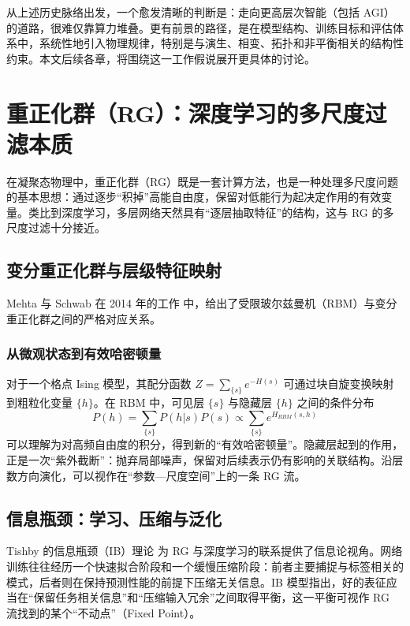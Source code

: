 \documentclass[12pt,a4paper]{article}
\begin{document}
从上述历史脉络出发，一个愈发清晰的判断是：走向更高层次智能（包括 AGI）的道路，很难仅靠算力堆叠。更有前景的路径，是在模型结构、训练目标和评估体系中，系统性地引入物理规律，特别是与演生、相变、拓扑和非平衡相关的结构性约束。本文后续各章，将围绕这一工作假说展开更具体的讨论。

\section{重正化群（RG）：深度学习的多尺度过滤本质}

在凝聚态物理中，重正化群（RG）既是一套计算方法，也是一种处理多尺度问题的基本思想：通过逐步“积掉”高能自由度，保留对低能行为起决定作用的有效变量。类比到深度学习，多层网络天然具有“逐层抽取特征”的结构，这与 RG 的多尺度过滤十分接近。

\subsection{变分重正化群与层级特征映射}

Mehta 与 Schwab 在 2014 年的工作\cite{mehta2014exact} 中，给出了受限玻尔兹曼机（RBM）与变分重正化群之间的严格对应关系。

\subsubsection{从微观状态到有效哈密顿量}

对于一个格点 Ising 模型，其配分函数 $Z = \sum_{\{s\}} e^{-H(s)}$ 可通过块自旋变换映射到粗粒化变量 $\{h\}$。在 RBM 中，可见层 $\{s\}$ 与隐藏层 $\{h\}$ 之间的条件分布
\begin{equation}
    P(h) = \sum_{\{s\}} P(h|s) P(s) \propto \sum_{\{s\}} e^{H_{RBM}(s, h)}
\end{equation}
可以理解为对高频自由度的积分，得到新的“有效哈密顿量”。隐藏层起到的作用，正是一次“紫外截断”：抛弃局部噪声，保留对后续表示仍有影响的关联结构\cite{lin2017why}。沿层数方向演化，可以视作在“参数—尺度空间”上的一条 RG 流。

\subsection{信息瓶颈：学习、压缩与泛化}

Tishby 的信息瓶颈（IB）理论\cite{tishby2015deep} 为 RG 与深度学习的联系提供了信息论视角。网络训练往往经历一个快速拟合阶段和一个缓慢压缩阶段：前者主要捕捉与标签相关的模式，后者则在保持预测性能的前提下压缩无关信息。IB 模型指出，好的表征应当在“保留任务相关信息”和“压缩输入冗余”之间取得平衡，这一平衡可视作 RG 流找到的某个“不动点”（Fixed Point）\cite{koch2018mutual}。
\end{document}
